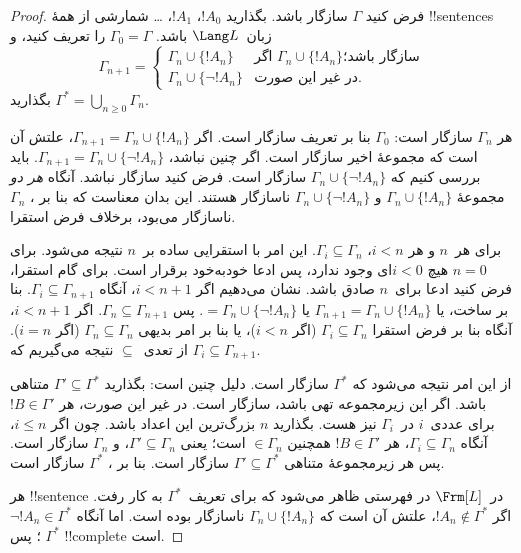 \documentclass[../../../include/open-logic-section]{subfiles}
\begin{document}
\begin{proof}
فرض کنید $\Gamma$ سازگار باشد. بگذارید $!A_0$، $!A_1$،
\dots{} شمارشی از همهٔ !!{sentence}s زبان~$\Lang L$ باشد.
$\Gamma_0 = \Gamma$ را تعریف کنید، و
\[
\Gamma_{n+1} =
\begin{cases}
\Gamma_n \cup \{ !A_n \} & \textrm{اگر $\Gamma_n \cup \{!A_n\}$
  سازگار باشد؛} \\
\Gamma_n \cup \{ \lnot !A_n \} & \textrm{در غیر این صورت.}
\end{cases}
\]
بگذارید $\Gamma^* = \bigcup_{n \geq 0} \Gamma_n$.

هر $\Gamma_n$ سازگار است: $\Gamma_0$ بنا بر تعریف سازگار است. اگر
$\Gamma_{n+1} = \Gamma_n \cup \{!A_n\}$، علتش آن است که مجموعهٔ اخیر
سازگار است. اگر چنین نباشد، $\Gamma_{n+1} = \Gamma_n \cup \{\lnot
!A_n\}$. باید بررسی کنیم که $\Gamma_n \cup \{\lnot !A_n\}$ سازگار
است. فرض کنید سازگار نباشد. آنگاه \emph{هر دو} مجموعهٔ
$\Gamma_n \cup \{!A_n\}$ و $\Gamma_n \cup \{\lnot !A_n\}$ ناسازگار
هستند. این بدان معناست که بنا بر
،
$\Gamma_n$ ناسازگار می‌بود، برخلاف فرض استقرا.

برای هر~$n$ و هر $i < n$، $\Gamma_i \subseteq \Gamma_n$. این امر با
استقرایی ساده بر~$n$ نتیجه می‌شود. برای $n=0$ هیچ $i < 0$ای وجود ندارد،
پس ادعا خودبه‌خود برقرار است. برای گام استقرا، فرض کنید ادعا برای~$n$
صادق باشد. نشان می‌دهیم اگر $i < n+1$، آنگاه
$\Gamma_i \subseteq \Gamma_{n+1}$. بنا بر ساخت، یا
$\Gamma_{n+1} = \Gamma_n \cup \{!A_n\}$ یا
$= \Gamma_n \cup \{\lnot !A_n\}$. پس
$\Gamma_n \subseteq \Gamma_{n+1}$. اگر $i < n+1$، آنگاه بنا بر فرض
استقرا $\Gamma_i \subseteq \Gamma_n$ (اگر $i < n$)، یا بنا بر امر بدیهی
$\Gamma_n \subseteq \Gamma_n$ (اگر $i = n$). از تعدی~$\subseteq$
نتیجه می‌گیریم که $\Gamma_i \subseteq \Gamma_{n+1}$.

از این امر نتیجه می‌شود که $\Gamma^*$ سازگار است. دلیل چنین است:
بگذارید $\Gamma' \subseteq \Gamma^*$ متناهی باشد. اگر این زیرمجموعه
تهی باشد، سازگار است. در غیر این صورت،
هر $!B \in \Gamma'$ برای عددی~$i$ در~$\Gamma_i$ نیز هست. بگذارید $n$
بزرگ‌ترین این اعداد باشد. چون اگر $i \le n$، آنگاه
$\Gamma_i \subseteq \Gamma_n$، هر $!B \in \Gamma'$ همچنین
$\in \Gamma_n$ است؛ یعنی $\Gamma' \subseteq \Gamma_n$، و $\Gamma_n$
سازگار است. پس هر
زیرمجموعهٔ متناهی $\Gamma' \subseteq \Gamma^*$ سازگار است. بنا بر
، $\Gamma^*$ سازگار است.

هر !!{sentence} در~$\Frm[L]$ در فهرستی ظاهر می‌شود که برای
تعریف~$\Gamma^*$ به کار رفت. اگر $!A_n \notin \Gamma^*$، علتش آن است
که $\Gamma_n \cup \{!A_n\}$ ناسازگار بوده است. اما آنگاه
$\lnot !A_n \in \Gamma^*$؛ پس $\Gamma^*$ !!{complete} است.
\end{proof}
\end{document}
